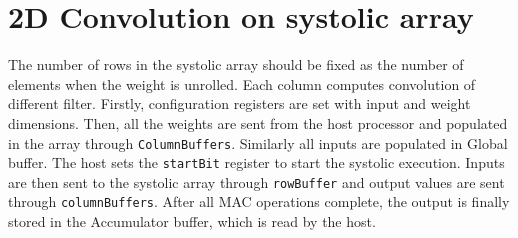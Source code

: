\documentclass{article}
\begin{document}
\section{2D Convolution on systolic array}
The number of rows in the systolic array should be fixed as the number of elements when the weight is unrolled. Each column computes convolution of different filter. Firstly, configuration registers are set with input and weight dimensions. Then, all the weights are sent from the host processor and populated in the array through \texttt{ColumnBuffers}. Similarly all inputs are populated in Global buffer. The host sets the \texttt{startBit} register to start the systolic execution. Inputs are then sent to the systolic array through \texttt{rowBuffer} and output values are sent through \texttt{columnBuffers}. After all MAC operations complete, the output is finally stored in the Accumulator buffer, which is read by the host.
\end{document}
